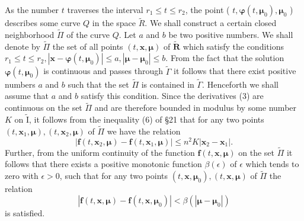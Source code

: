 \documentclass[10pt,a5paper]{book}
\makeatletter
\theoremstyle{plain}
\theoremstyle{definition}
\theoremstyle{remark}
\renewenvironment{proof}[1][\proofname]{\par
  \pushQED{\qed}%
  \normalfont\topsep6\p@\@plus6\p@\relax
  \trivlist
  \item\relax{\itshape #1\@addpunct{.}}\hspace\labelsep\ignorespaces
}{\popQED\endtrivlist\@endpefalse}
\makeatother
\begin{document}
\begin{proof}
As the number $t$ traverses the interval $r_{1} \leq t \leq r_{2}$, the point ( $t, \boldsymbol{\varphi}\left(t, \boldsymbol{\mu}_{0}\right), \boldsymbol{\mu}_{0}$ ) describes some curve $Q$ in the space $\widetilde{R}$. We shall construct a certain closed neighborhood $\widetilde{\Pi}$ of the curve $Q$. Let $a$ and $b$ be two positive numbers. We shall denote by $\widetilde{\Pi}$ the set of all points $(t, \mathbf{x}, \boldsymbol{\mu})$ of $\widetilde{\boldsymbol{R}}$ which satisfy the conditions $r_{1} \leq t \leq r_{2},\left|\mathbf{x}-\boldsymbol{\varphi}\left(t, \boldsymbol{\mu}_{0}\right)\right| \leq a,\left|\boldsymbol{\mu}-\boldsymbol{\mu}_{0}\right| \leq b$. From the fact that the solution $\boldsymbol{\varphi}\left(t, \boldsymbol{\mu}_{0}\right)$ is continuous and passes through $\widetilde{\Gamma}$ it follows that there exist positive numbers $a$ and $b$ such that the set $\widetilde{\Pi}$ is contained in $\widetilde{\Gamma}$. Henceforth we shall assume that $a$ and $b$ satisfy this condition. Since the derivatives (3) are continuous on the set $\widetilde{\Pi}$ and are therefore bounded in modulus by some number $K$ on $\widetilde{\mathrm{I}}$, it follows from the
inequality (6) of §21 that for any two points $\left(t, \mathbf{x}_{1}, \boldsymbol{\mu}\right),\left(t, \mathbf{x}_{2}, \boldsymbol{\mu}\right)$ of $\widetilde{\Pi}$ we have the relation
\begin{equation*}
\left|\mathbf{f}\left(t, \mathbf{x}_{2}, \boldsymbol{\mu}\right)-\mathbf{f}\left(t, \mathbf{x}_{1}, \boldsymbol{\mu}\right)\right| \leq n^{2} K\left|\mathbf{x}_{2}-\mathbf{x}_{1}\right| . \tag{10}
\end{equation*}
Further, from the uniform continuity of the function $\mathbf{f}(t, \mathbf{x}, \boldsymbol{\mu})$ on the set $\widetilde{\Pi}$ it follows that there exists a positive monotonic function $\beta(\epsilon)$ of $\epsilon$ which tends to zero with $\epsilon>0$, such that for any two points $\left(t, \mathbf{x}, \boldsymbol{\mu}_{0}\right),(t, \mathbf{x}, \boldsymbol{\mu})$ of $\widetilde{\Pi}$ the relation
\begin{equation*}
\left|\mathbf{f}(t, \mathbf{x}, \boldsymbol{\mu})-\mathbf{f}\left(t, \mathbf{x}, \boldsymbol{\mu}_{0}\right)\right|<\beta\left(\left|\boldsymbol{\mu}-\boldsymbol{\mu}_{0}\right|\right) \tag{11}
\end{equation*}
is satisfied.


\end{proof}
\end{document}
